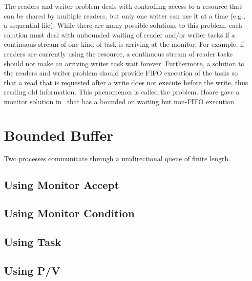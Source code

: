 \documentclass[openright,twoside]{report}
\begin{document}
The readers and writer problem deals with controlling access to a resource that can be shared by multiple readers, but only one writer can use it at a time (e.g., a sequential file).
While there are many possible solutions to this problem, each solution must deal with unbounded waiting of reader and/or writer tasks if a continuous stream of one kind of task is arriving at the monitor.
For example, if readers are currently using the resource, a continuous stream of reader tasks should not make an arriving writer task wait forever.
Furthermore, a solution to the readers and writer problem should provide FIFO execution of the tasks so that a read that is requested after a write does not execute before the write, thus reading old information.
This phenomenon is called the  problem.
Hoare gave a monitor solution in~\cite{Hoare74} that has a bounded on waiting but non-FIFO execution.



\section{Bounded Buffer}
\label{s:BoundedBuffer}

Two processes communicate through a unidirectional queue of finite length.


\subsection{Using Monitor Accept}
\label{s:UsingMonitorAccept}



\subsection{Using Monitor Condition}
\label{s:UsingMonitorCondition}



\subsection{Using Task}
\label{s:UsingTask}



\subsection{Using P/V}
\label{s:UsingP/V}
\end{document}
